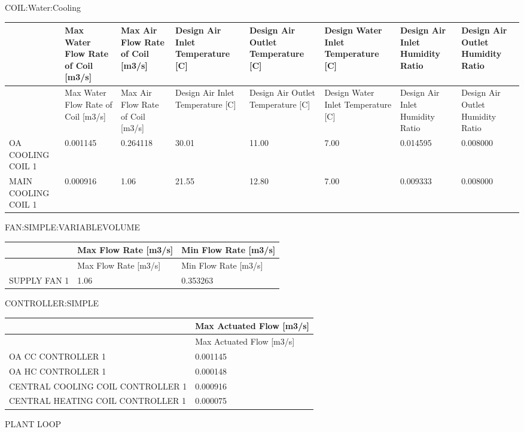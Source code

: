 COIL:Water:Cooling

\begin{longtable}[c]{>{\raggedright}p{0.75in}>{\raggedright}p{0.75in}>{\raggedright}p{0.75in}>{\raggedright}p{0.75in}>{\raggedright}p{0.75in}>{\raggedright}p{0.75in}>{\raggedright}p{0.75in}>{\raggedright}p{0.75in}}
\toprule 
~ & Max Water Flow Rate of Coil [m3/s] & Max Air Flow Rate of Coil [m3/s] & Design Air Inlet Temperature [C] & Design Air Outlet Temperature [C] & Design Water Inlet Temperature [C] & Design Air Inlet Humidity Ratio & Design Air Outlet Humidity Ratio \tabularnewline
\midrule
\endfirsthead

\toprule 
~ & Max Water Flow Rate of Coil [m3/s] & Max Air Flow Rate of Coil [m3/s] & Design Air Inlet Temperature [C] & Design Air Outlet Temperature [C] & Design Water Inlet Temperature [C] & Design Air Inlet Humidity Ratio & Design Air Outlet Humidity Ratio \tabularnewline
\midrule
\endhead

OA COOLING COIL 1 & 0.001145 & 0.264118 & 30.01 & 11.00 & 7.00 & 0.014595 & 0.008000 \tabularnewline
MAIN COOLING COIL 1 & 0.000916 & 1.06 & 21.55 & 12.80 & 7.00 & 0.009333 & 0.008000 \tabularnewline
\bottomrule
\end{longtable}

FAN:SIMPLE:VARIABLEVOLUME

\begin{longtable}[c]{@{}lll@{}}
\toprule 
~ & Max Flow Rate [m3/s] & Min Flow Rate [m3/s] \tabularnewline
\midrule
\endfirsthead

\toprule 
~ & Max Flow Rate [m3/s] & Min Flow Rate [m3/s] \tabularnewline
\midrule
\endhead

SUPPLY FAN 1 & 1.06 & 0.353263 \tabularnewline
\bottomrule
\end{longtable}

CONTROLLER:SIMPLE

\begin{longtable}[c]{@{}ll@{}}
\toprule 
~ & Max Actuated Flow [m3/s] \tabularnewline
\midrule
\endfirsthead

\toprule 
~ & Max Actuated Flow [m3/s] \tabularnewline
\midrule
\endhead

OA CC CONTROLLER 1 & 0.001145 \tabularnewline
OA HC CONTROLLER 1 & 0.000148 \tabularnewline
CENTRAL COOLING COIL CONTROLLER 1 & 0.000916 \tabularnewline
CENTRAL HEATING COIL CONTROLLER 1 & 0.000075 \tabularnewline
\bottomrule
\end{longtable}

PLANT LOOP

